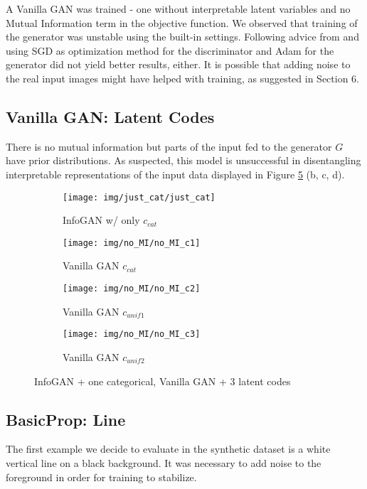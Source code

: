 \documentclass{article}
\begin{document}
A Vanilla GAN was trained - one without interpretable latent variables and no Mutual Information term in the objective function. We observed that training of the generator was unstable using the built-in settings. Following advice from \cite{howtotrainagan2016} and using SGD as optimization method for the discriminator and Adam for the generator did not yield better results, either. It is possible that adding noise to the real input images might have helped with training, as suggested in Section 6.

\subsection{Vanilla GAN: Latent Codes}

There is no mutual information but parts of the input fed to the generator $G$ have prior distributions. As suspected, this model is unsuccessful in disentangling interpretable representations of the input data displayed in Figure \ref{only-cat-no-MI} (b, c, d).

\begin{figure}[ht]
\begin{subfigure}{.23\textwidth}
\centering
\texttt{[image: img/just\_cat/just\_cat]}
\caption{InfoGAN w/ only $c_{cat}$ }
\label{just_cat}
\end{subfigure}
\begin{subfigure}{.23\textwidth}
  \centering
  \texttt{[image: img/no\_MI/no\_MI\_c1]}
  \caption{Vanilla GAN $c_{cat}$}
  \label{fig:sub1}
\end{subfigure}%
\begin{subfigure}{.23\textwidth}
  \centering
  \texttt{[image: img/no\_MI/no\_MI\_c2]}
  \caption{Vanilla GAN $c_{unif1}$}
  \label{fig:sub2}
\end{subfigure}
\begin{subfigure}{.23\textwidth}
  \centering
  \texttt{[image: img/no\_MI/no\_MI\_c3]}
  \caption{Vanilla GAN $c_{unif2}$}
  \label{fig:sub3}
\end{subfigure}
\caption{InfoGAN + one categorical, Vanilla GAN + 3 latent codes}
\label{only-cat-no-MI}
\end{figure}

\subsection{BasicProp: Line}

The first example we decide to evaluate in the synthetic dataset is a white vertical line on a black background. It was necessary to add noise to the foreground in order for training to stabilize.
\end{document}
